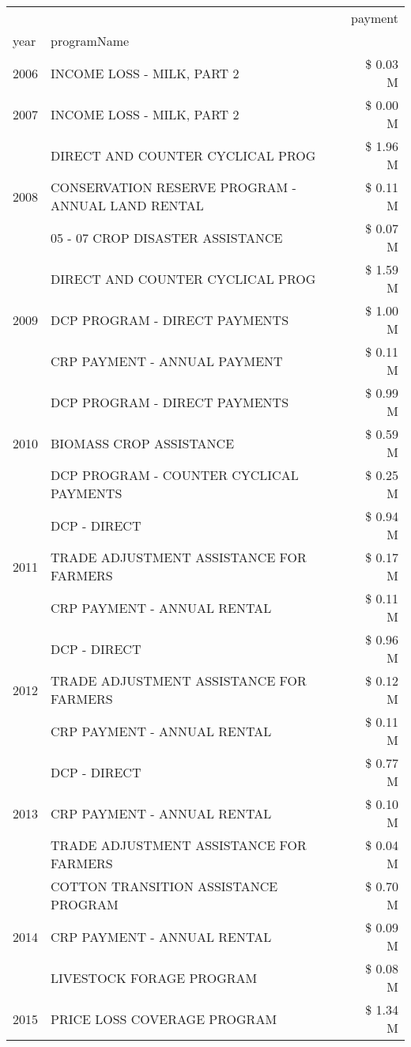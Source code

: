 \begin{tabular}{llr}
\toprule
 &  & payment \\
year & programName &  \\
\midrule
2006 & INCOME LOSS - MILK, PART 2 & \$ 0.03 M \\
\cline{1-3}
2007 & INCOME LOSS - MILK, PART 2 & \$ 0.00 M \\
\cline{1-3}
\multirow[t]{3}{*}{2008} & DIRECT AND COUNTER CYCLICAL PROG & \$ 1.96 M \\
 & CONSERVATION RESERVE PROGRAM - ANNUAL LAND RENTAL & \$ 0.11 M \\
 & 05 - 07 CROP DISASTER ASSISTANCE & \$ 0.07 M \\
\cline{1-3}
\multirow[t]{3}{*}{2009} & DIRECT AND COUNTER CYCLICAL PROG & \$ 1.59 M \\
 & DCP PROGRAM - DIRECT PAYMENTS & \$ 1.00 M \\
 & CRP PAYMENT - ANNUAL PAYMENT & \$ 0.11 M \\
\cline{1-3}
\multirow[t]{3}{*}{2010} & DCP PROGRAM - DIRECT PAYMENTS & \$ 0.99 M \\
 & BIOMASS CROP ASSISTANCE & \$ 0.59 M \\
 & DCP PROGRAM - COUNTER CYCLICAL PAYMENTS & \$ 0.25 M \\
\cline{1-3}
\multirow[t]{3}{*}{2011} & DCP - DIRECT & \$ 0.94 M \\
 & TRADE ADJUSTMENT ASSISTANCE FOR FARMERS & \$ 0.17 M \\
 & CRP PAYMENT - ANNUAL RENTAL & \$ 0.11 M \\
\cline{1-3}
\multirow[t]{3}{*}{2012} & DCP - DIRECT & \$ 0.96 M \\
 & TRADE ADJUSTMENT ASSISTANCE FOR FARMERS & \$ 0.12 M \\
 & CRP PAYMENT - ANNUAL RENTAL & \$ 0.11 M \\
\cline{1-3}
\multirow[t]{3}{*}{2013} & DCP - DIRECT & \$ 0.77 M \\
 & CRP PAYMENT - ANNUAL RENTAL & \$ 0.10 M \\
 & TRADE ADJUSTMENT ASSISTANCE FOR FARMERS & \$ 0.04 M \\
\cline{1-3}
\multirow[t]{3}{*}{2014} & COTTON TRANSITION ASSISTANCE PROGRAM & \$ 0.70 M \\
 & CRP PAYMENT - ANNUAL RENTAL & \$ 0.09 M \\
 & LIVESTOCK FORAGE PROGRAM & \$ 0.08 M \\
\cline{1-3}
\multirow[t]{3}{*}{2015} & PRICE LOSS COVERAGE PROGRAM & \$ 1.34 M \\

\end{tabular}
